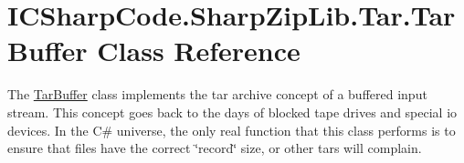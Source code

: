 \hypertarget{class_i_c_sharp_code_1_1_sharp_zip_lib_1_1_tar_1_1_tar_buffer}{}\section{I\+C\+Sharp\+Code.\+Sharp\+Zip\+Lib.\+Tar.\+Tar\+Buffer Class Reference}
\label{class_i_c_sharp_code_1_1_sharp_zip_lib_1_1_tar_1_1_tar_buffer}


The \hyperlink{class_i_c_sharp_code_1_1_sharp_zip_lib_1_1_tar_1_1_tar_buffer}{Tar\+Buffer} class implements the tar archive concept of a buffered input stream. This concept goes back to the days of blocked tape drives and special io devices. In the C\# universe, the only real function that this class performs is to ensure that files have the correct \char`\"{}record\char`\"{} size, or other tars will complain.  


